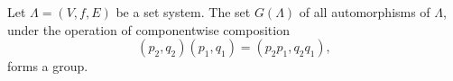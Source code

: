 Let $\Lambda = (V, f, E)$ be a set system. The set $G(\Lambda)$ of all automorphisms of $\Lambda$, under the operation of componentwise composition
$$(p_2, q_2)(p_1, q_1) = (p_2p_1, q_2q_1),$$
forms a group.
